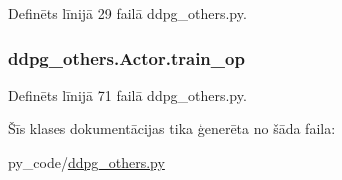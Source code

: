 Definēts līnijā 29 failā ddpg\+\_\+others.\+py.

\subsubsection[{\texorpdfstring{train\+\_\+op}{train_op}}]{\setlength{\rightskip}{0pt plus 5cm}ddpg\+\_\+others.\+Actor.\+train\+\_\+op}\hypertarget{classddpg__others_1_1_actor_a32ca210848490a09496872c1dc69c6a4}{}\label{classddpg__others_1_1_actor_a32ca210848490a09496872c1dc69c6a4}


Definēts līnijā 71 failā ddpg\+\_\+others.\+py.



Šīs klases dokumentācijas tika ģenerēta no šāda faila\+:\begin{DoxyCompactItemize}
\item 
py\+\_\+code/\hyperlink{ddpg__others_8py}{ddpg\+\_\+others.\+py}\end{DoxyCompactItemize}
